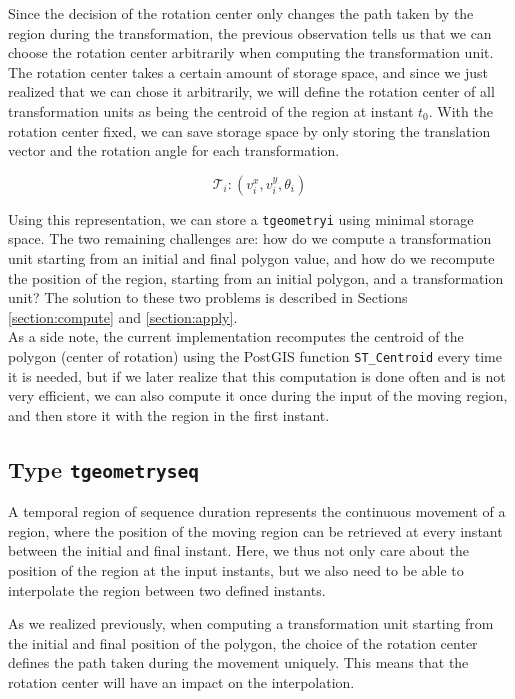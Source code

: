 Since the decision of the rotation center only changes the path taken by the region during the transformation, the previous observation tells us that we can choose the rotation center arbitrarily when computing the transformation unit. \\

The rotation center takes a certain amount of storage space, and since we just realized that we can chose it arbitrarily, we will define the rotation center of all transformation units as being the centroid of the region at instant $t_0$. With the rotation center fixed, we can save storage space by only storing the translation vector and the rotation angle for each transformation. 

\[
    \mathcal{T}_i: (v_i^x, v_i^y, \theta_i)
\]

Using this representation, we can store a \lstinline{tgeometryi} using minimal storage space. The two remaining challenges are: how do we compute a transformation unit starting from an initial and final polygon value, and how do we recompute the position of the region, starting from an initial polygon, and a transformation unit? The solution to these two problems is described in Sections \ref{section:compute} and \ref{section:apply}. \\

As a side note, the current implementation recomputes the centroid of the polygon (center of rotation) using the PostGIS function \lstinline{ST_Centroid} every time it is needed, but if we later realize that this computation is done often and is not very efficient, we can also compute it once during the input of the moving region, and then store it with the region in the first instant.

\subsection{Type \texttt{tgeometryseq}}
\label{section:internal_repr_seq}

A temporal region of sequence duration represents the continuous movement of a region, where the position of the moving region can be retrieved at every instant between the initial and final instant. Here, we thus not only care about the position of the region at the input instants, but we also need to be able to interpolate the region between two defined instants.

As we realized previously, when computing a transformation unit starting from the initial and final position of the polygon, the choice of the rotation center defines the path taken during the movement uniquely. This means that the rotation center will have an impact on the interpolation. \\

